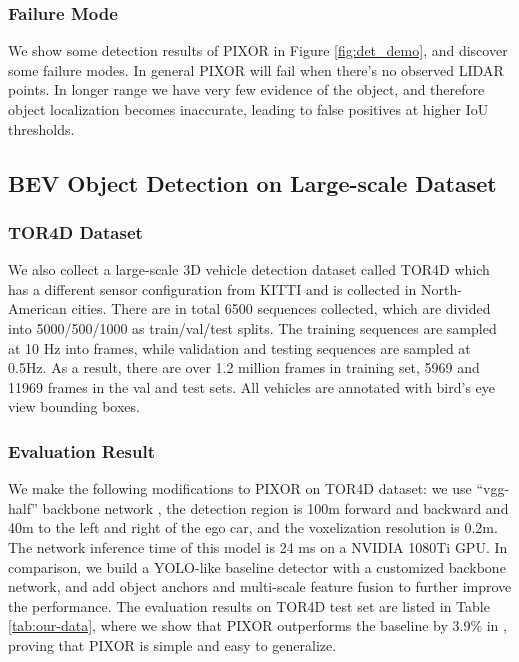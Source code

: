 \vspace{-0.2cm}
\subsubsection{Failure Mode} We show some detection results of PIXOR in Figure \ref{fig:det_demo}, and discover some failure modes. In general PIXOR will fail when there's no observed LIDAR points. In longer range we have very few evidence of the object, and therefore object localization becomes inaccurate, leading to false positives at higher IoU thresholds.

\subsection{BEV Object Detection on Large-scale Dataset}

\subsubsection{TOR4D Dataset}
We also collect a large-scale 3D vehicle detection dataset called TOR4D which has a different sensor configuration from KITTI and is collected in North-American cities. There are in total 6500 sequences collected, which are divided into 5000/500/1000 as train/val/test splits. The training sequences are sampled at 10 Hz into frames, while validation and testing sequences are sampled at 0.5Hz. As a result, there are over 1.2 million frames in training set, 5969 and 11969 frames in the val and test sets. All vehicles are annotated with bird's eye view bounding boxes.

\vspace{-0.2cm}
\subsubsection{Evaluation Result}
We make the following modifications to PIXOR on TOR4D dataset: we use ``vgg-half'' backbone network \cite{mv3d}, the detection region is 100m forward and backward and 40m to the left and right of the ego car, and the voxelization resolution is 0.2m. The network inference time of this model is 24 ms on a NVIDIA 1080Ti GPU. In comparison, we build a YOLO-like \cite{yolo} baseline detector with a customized backbone network, and add object anchors and multi-scale feature fusion to further improve the performance. The evaluation results on TOR4D test set are listed in Table \ref{tab:our-data}, where we show that PIXOR outperforms the baseline by 3.9\% in , proving that PIXOR is simple and easy to generalize.

